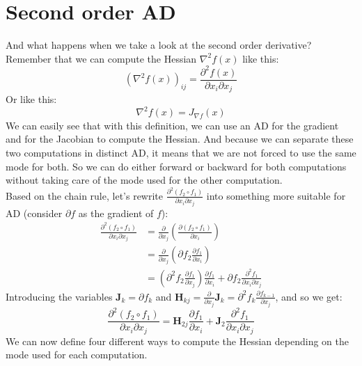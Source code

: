 \documentclass[12pt, openany]{report}
\newcommand{\J}{\mathbf{J}}
\newcommand{\He}{\mathbf{H}}
\theoremstyle{definition}
\begin{document}
\section{Second order AD}
And what happens when we take a look at the second order derivative? Remember that we can compute the Hessian $\nabla^2 f(x)$ like this:
\begin{equation}
  (\nabla^2 f(x))_{ij} = \frac{\partial^2 f(x)}{\partial x_i \partial x_j}
\end{equation}
Or like this:
\begin{equation}
  \nabla^2 f(x) = J_{\nabla f}(x)
\end{equation}
We can easily see that with this definition, we can use an AD for the gradient and for the Jacobian to compute the Hessian. And because we can separate these two computations in distinct AD, it means that we are not forced to use the same mode for both. So we can do either forward or backward for both computations without taking care of the mode used for the other computation.\\

Based on the chain rule, let's rewrite $\frac{\partial^2 (f_2 \circ f_1)}{\partial x_i \partial x_j}$ into something more suitable for AD (consider $\partial f$ as the gradient of $f$):
\begin{equation}
  \begin{aligned}
    \frac{\partial^2 (f_2 \circ f_1)}{\partial x_i \partial x_j} &= \frac{\partial}{\partial x_j} \left( \frac{ \partial (f_2 \circ f_1)}{\partial x_i} \right) \\
    &= \frac{\partial}{\partial x_j} \left( \partial f_2 \frac{ \partial f_1}{\partial x_i} \right) \\
    &= \left( \partial^2 f_2 \frac{\partial f_1}{\partial x_j} \right) \frac{\partial f_1}{\partial x_i} + \partial f_2 \frac{\partial^2 f_1}{\partial x_i \partial x_j} 
  \end{aligned}
\end{equation}
Introducing the variables $\J_k = \partial f_k$ and $\He_{kj} = \frac{\partial}{\partial x_j} \J_k = \partial^2 f_k \frac{\partial f_{k-1}}{\partial x_j}$, and so we get:
\begin{equation}
  \frac{\partial^2 (f_2 \circ f_1)}{\partial x_i \partial x_j} = \He_{2j} \frac{\partial f_1}{\partial x_i} + \J_2 \frac{\partial^2 f_1}{\partial x_i \partial x_j}
\end{equation}
We can now define four different ways to compute the Hessian depending on the mode used for each computation.
\end{document}
